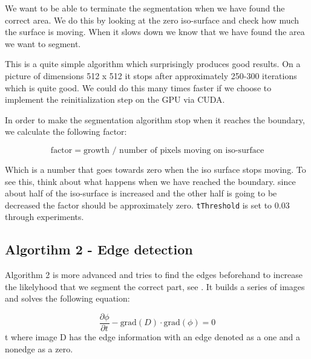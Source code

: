 We want to be able to terminate the segmentation when we have found
the correct area. We do this by looking at the zero iso-surface and
check how much the surface is moving. When it slows down we know that
we have found the area we want to segment.

This is a quite simple algorithm which surprisingly produces good
results. On a picture of dimensions 512 x 512 it stops after
approximately 250-300 iterations which is quite good. We could do this
many times faster if we choose to implement the reinitialization step
on the GPU via CUDA.

In order to make the segmentation algorithm stop when it reaches the
boundary, we calculate the following factor:

\begin{equation*}
 \textrm{factor} = \textrm{growth } / \textrm{ number of pixels moving on iso-surface}
\end{equation*}

Which is a number that goes towards zero when the iso surface stops
moving. To see this, think about what happens when we have reached the
boundary. since about half of the iso-surface is increased and the
other half is going to be decreased the factor should be approximately
zero. \texttt{tThreshold} is set to 0.03 through experiments.


\subsection{Algortihm 2 - Edge detection}
\label{segmentation:sec:algorithm2}


Algorithm 2 is more advanced and tries to find the edges beforehand to
increase the likelyhood that we segment the correct part, see
. It builds a series of images and solves the
following equation:

\begin{equation}
\label{segmentation:equation:advanced}
  \dfrac{\partial \phi}{\partial t} - \textrm{grad}(D) \cdot \textrm{grad}(\phi) = 0
\end{equation}
t
where image D has the edge information with an edge denoted as a one and a nonedge as a zero.


